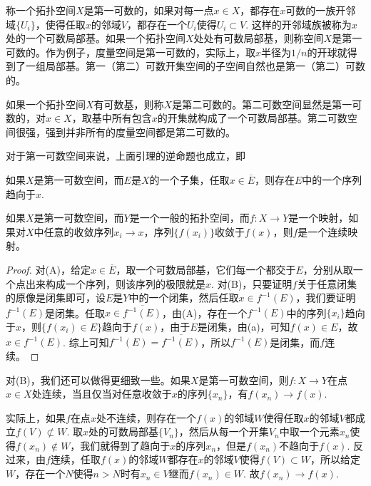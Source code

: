 \begin{para}
	称一个拓扑空间$X$是第一可数的，如果对每一点$x\in X$，都存在$x$可数的一族开邻域$\{U_i\}$，使得任取$x$的邻域$V$，都存在一个$U_i$使得$U_i\subset V$. 这样的开邻域族被称为$x$处的一个可数局部基。如果一个拓扑空间$X$处处有可数局部基，则称空间$X$是第一可数的。作为例子，度量空间是第一可数的，实际上，取$x$半径为$1/n$的开球就得到了一组局部基。第一（第二）可数开集空间的子空间自然也是第一（第二）可数的。

	如果一个拓扑空间$X$有可数基，则称$X$是第二可数的。第二可数空间显然是第一可数的，对$x\in X$，取基中所有包含$x$的开集就构成了一个可数局部基。第二可数空间很强，强到并非所有的度量空间都是第二可数的。

	对于第一可数空间来说，上面引理的逆命题也成立，即
	\begin{compactenum}[~~~(A)]\it 
	\item 如果$X$是第一可数空间，而$E$是$X$的一个子集，任取$x\in \overline{E}$，则存在$E$中的一个序列趋向于$x$.
	\item 如果$X$是第一可数空间，而$Y$是一个一般的拓扑空间，而$f:X\to Y$是一个映射，如果对$X$中任意的收敛序列$x_i\to x$，序列$\{f(x_i)\}$收敛于$f(x)$，则$f$是一个连续映射。
	\end{compactenum}

	\begin{proof}
	对(A)，给定$x\in \overline{E}$，取一个可数局部基，它们每一个都交于$E$，分别从取一个点出来构成一个序列，则该序列的极限就是$x$. 对(B)，只要证明$f$关于任意闭集的原像是闭集即可，设$E$是$Y$中的一个闭集，然后任取$x\in f^{-1}(E)$，我们要证明$f^{-1}(E)$是闭集。任取$x\in \overline{f^{-1}(E)}$，由(A)，存在一个$f^{-1}(E)$中的序列$\{x_i\}$趋向于$x$，则$\{f(x_i)\in E\}$趋向于$f(x)$，由于$E$是闭集，由(a)，可知$f(x)\in E$，故$x\in f^{-1}(E)$. 综上可知$f^{-1}(E)=\overline{f^{-1}(E)}$，所以$f^{-1}(E)$是闭集，而$f$连续。
	\end{proof}

	对(B)，我们还可以做得更细致一些。如果$X$是第一可数空间，则$f:X\to Y$在点$x\in X$处连续，当且仅当对任意收敛于$x$的序列$\{x_n\}$，有$f(x_n)\to f(x)$.

	实际上，如果$f$在点$x$处不连续，则存在一个$f(x)$的邻域$W$使得任取$x$的邻域$V$都成立$f(V)\not\subset W$. 取$x$处的可数局部基$\{V_n\}$，然后从每一个开集$V_n$中取一个元素$x_n$使得$f(x_n)\not\in W$，我们就得到了趋向于$x$的序列$x_n$，但是$f(x_n)$不趋向于$f(x)$. 反过来，由$f$连续，任取$f(x)$的邻域$W$都存在$x$的邻域$V$使得$f(V)\subset W$，所以给定$W$，存在一个$N$使得$n>N$时有$x_n\in V$继而$f(x_n)\in W$. 故$f(x_n)\to f(x)$.
\end{para}

